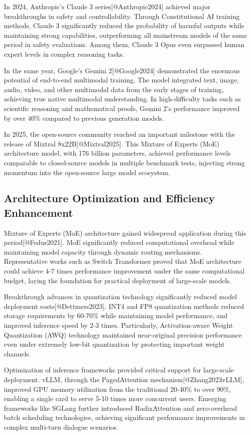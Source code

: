 \documentclass{article}
\begin{document}
In 2024, Anthropic's Claude 3 series[@Anthropic2024] achieved major breakthroughs in safety and controllability. Through Constitutional AI training methods, Claude 3 significantly reduced the probability of harmful outputs while maintaining strong capabilities, outperforming all mainstream models of the same period in safety evaluations. Among them, Claude 3 Opus even surpassed human expert levels in complex reasoning tasks.

In the same year, Google's Gemini 2[@Google2024] demonstrated the enormous potential of end-to-end multimodal training. The model integrated text, image, audio, video, and other multimodal data from the early stages of training, achieving true native multimodal understanding. In high-difficulty tasks such as scientific reasoning and mathematical proofs, Gemini 2's performance improved by over 40\% compared to previous generation models.

In 2025, the open-source community reached an important milestone with the release of Mixtral 8x22B[@Mixtral2025]. This Mixture of Experts (MoE) architecture model, with 176 billion parameters, achieved performance levels comparable to closed-source models in multiple benchmark tests, injecting strong momentum into the open-source large model ecosystem.

\subsection{Architecture Optimization and Efficiency Enhancement}
Mixture of Experts (MoE) architecture gained widespread application during this period[@Fedus2021]. MoE significantly reduced computational overhead while maintaining model capacity through dynamic routing mechanisms. Representative works such as Switch Transformer proved that MoE architecture could achieve 4-7 times performance improvement under the same computational budget, laying the foundation for practical deployment of large-scale models.

Breakthrough advances in quantization technology significantly reduced model deployment costs[@Dettmers2023]. INT4 and FP8 quantization methods reduced storage requirements by 60-70\% while maintaining model performance, and improved inference speed by 2-3 times. Particularly, Activation-aware Weight Quantization (AWQ) technology maintained near-original precision performance even under extremely low-bit quantization by protecting important weight channels.

Optimization of inference frameworks provided critical support for large-scale deployment. vLLM, through the PagedAttention mechanism[@Zhang2023vLLM], improved GPU memory utilization from the traditional 20-40\% to over 90\%, enabling a single card to serve 5-10 times more concurrent users. Emerging frameworks like SGLang further introduced RadixAttention and zero-overhead batch scheduling technologies, achieving significant performance improvements in complex multi-turn dialogue scenarios.
\end{document}
